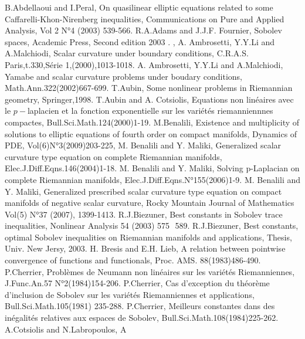 \documentclass{Tran-l}
\theoremstyle{definition}
\theoremstyle{remark}
\numberwithin{equation}{section}
\begin{document}

\begin{thebibliography}{11}
B.Abdellaoui and I.Peral, On quasilinear
elliptic equations related to some Caffarelli-Khon-Nirenberg
inequalities, Communications on  Pure and Applied Analysis, Vol 2
N°4 (2003) 539-566.
R.A.Adams and J.J.F. Fournier, Sobolev spaces, Academic Press, Second
edition 2003 .
, A. Ambrosetti, Y.Y.Li and
A.Malchiodi, Scalar curvature under boundary conditions, C.R.A.S.
Paris,t.330,Série 1,(2000),1013-1018.
A. Ambrosetti, Y.Y.Li and
A.Malchiodi, Yamabe and scalar curvature problems under boudary
conditions, Math.Ann.322(2002)667-699.
T.Aubin, Some nonlinear problems in Riemannian
geometry, Springer,1998.
T.Aubin and A. Cotsiolis, Equations non
linéaires avec le $p-$laplacien et la fonction exponentielle sur les
variétés riemanniennnes compactes, Bull.Sci.Math.124(2000)1-19.
 M.Benalili, Existence and multiplicity of solutions to elliptic
 equations of fourth order on compact manifolds, Dynamics of PDE, Vol(6)N°3(2009)203-225,
M. Benalili and Y. Maliki, Generalized scalar curvature
type equation on complete Riemannian manifolds,
Elec.J.Diff.Eqns.146(2004)1-18.
 M. Benalili and Y. Maliki, Solving p-Laplacian on
complete Riemannian manifolds, Elec.J.Diff.Eqns.N°155(2006)1-9.
M. Benalili and Y. Maliki, Generalized prescribed scalar
curvature type equation on compact manifolds of negative scalar
curvature, Rocky Mountain Journal of Mathematics Vol(5) N°37 (2007),
1399-1413.
 R.J.Biezuner, Best constants in Sobolev trace
inequalities, Nonlinear Analysis 54 (2003) 575  589.
 R.J.Biezuner, Best constants, optimal Sobolev
inequalities on Riemannian manifolds and applications, Thesis, Univ.
New Jersy, 2003.
 H. Bresis and E.H. Lieb, A relation between
pointwise convergence of functions and functionals, Proc. AMS.
88(1983)486-490.
 P.Cherrier, Problèmes de Neumann non linéaires sur
les variétés Riemanniennes, J.Func.An.57 N°2(1984)154-206.
 P.Cherrier, Cas d'exception du théorème
d'inclusion de Sobolev sur les variétés Riemanniennes et
applications, Bull.Sci.Math.105(1981) 235-288.
P.Cherrier, Meilleurs constantes dans des
inégalités relatives aux espaces de Sobolev,
Bull.Sci.Math.108(1984)225-262.
 A.Cotsiolis and N.Labropoulos, A

\end{thebibliography}
\end{document}
